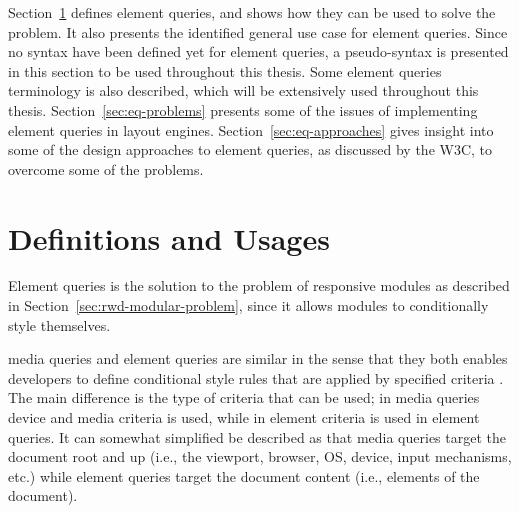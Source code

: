 \documentclass[a4paper,11pt]{kth-mag}
\begin{document}
    Section~\ref{sec:eq-definitions} defines element queries, and shows how they can be used to solve the problem.
    It also presents the identified general use case for element queries.
    Since no syntax have been defined yet for element queries, a pseudo-syntax is presented in this section to be used throughout this thesis.
    Some element queries terminology is also described, which will be extensively used throughout this thesis.
    Section~\ref{sec:eq-problems} presents some of the issues of implementing element queries  in \glspl{layout engine}.
    Section~\ref{sec:eq-approaches} gives insight into some of the design approaches to element queries, as discussed by the W3C, to overcome some of the problems.

    \section{Definitions and Usages}\label{sec:eq-definitions}
      \noindent
      Element queries is the solution to the problem of \gls{responsive} modules as described in Section~\ref{sec:rwd-modular-problem}, since it allows modules to conditionally style themselves.

      \Gls{media queries} and element queries are similar in the sense that they both enables developers to define conditional style rules that are applied by specified criteria \cite{w3c_css_mq}.
      The main difference is the type of criteria that can be used; in \gls{media queries} device and media criteria is used, while in element criteria is used in element queries.
      It can somewhat simplified be described as that \gls{media queries} target the \gls{document} root and up (i.e., the \gls{viewport}, \gls{browser}, OS, device, input mechanisms, etc.) while element queries target the \gls{document} content (i.e., \glspl{element} of the \gls{document}).
\end{document}
